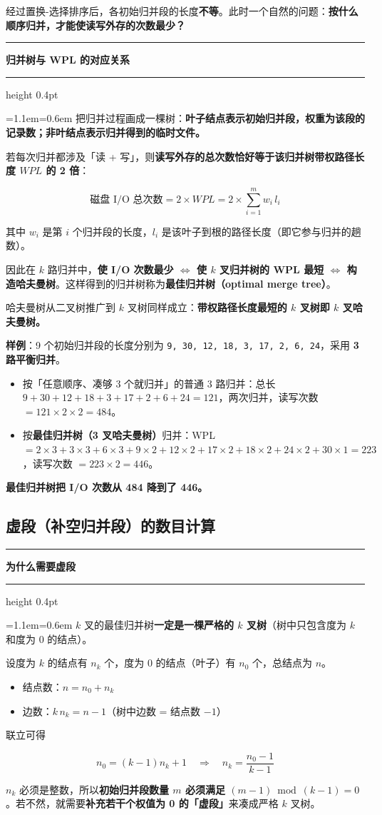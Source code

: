 \documentclass[11pt,openany,UTF8]{ctexbook}
\newcommand{\callouthead}[2]{%
  \par\addvspace{7pt}\noindent
  {\color{#1}\rule[-0.15em]{3pt}{1.05em}}\hspace{0.5em}%
  {\bfseries\color{#1}#2}\par\nobreak\vspace{-0.35em}%
  {\color{rulesep}\hrule height 0.4pt}\nobreak\vspace{0.45em}%
  \begingroup\small\setlength{\parindent}{0pt}%
  \leftskip=1.1em\rightskip=0.6em\noindent\ignorespaces}
\newcommand{\calloutend}{\par\endgroup\addvspace{7pt}}
\newenvironment{callkey}[1]{\callouthead{keybar}{#1}}{\calloutend}
\newenvironment{callwarn}[1]{\callouthead{warnbar}{#1}}{\calloutend}
\begin{document}
经过置换-选择排序后，各初始归并段的长度\textbf{不等}。此时一个自然的问题：\textbf{按什么顺序归并，才能使读写外存的次数最少？}

\begin{callkey}{归并树与 WPL 的对应关系}
把归并过程画成一棵树：\textbf{叶子结点表示初始归并段，权重为该段的记录数；非叶结点表示归并得到的临时文件。}

若每次归并都涉及「读 + 写」，则\textbf{读写外存的总次数恰好等于该归并树带权路径长度 $WPL$ 的 2 倍}：

\[\text{磁盘 I/O 总次数}=2\times WPL=2\times\sum_{i=1}^{m} w_i\, l_i\]

其中 $w_i$ 是第 $i$ 个归并段的长度，$l_i$ 是该叶子到根的路径长度（即它参与归并的趟数）。

因此在 $k$ 路归并中，\textbf{使 I/O 次数最少 $\Leftrightarrow$ 使 $k$ 叉归并树的 WPL 最短 $\Leftrightarrow$ 构造哈夫曼树}。这样得到的归并树称为\textbf{最佳归并树（optimal merge tree）}。

哈夫曼树从二叉树推广到 $k$ 叉树同样成立：\textbf{带权路径长度最短的 $k$ 叉树即 $k$ 叉哈夫曼树。}

\end{callkey}

\textbf{样例}：9 个初始归并段的长度分别为 \texttt{9,\allowbreak{} 30,\allowbreak{} 12,\allowbreak{} 18,\allowbreak{} 3,\allowbreak{} 17,\allowbreak{} 2,\allowbreak{} 6,\allowbreak{} 24}，采用 \textbf{3 路平衡归并}。

\begin{itemize}
\item 按「任意顺序、凑够 3 个就归并」的普通 3 路归并：总长 $9+30+12+18+3+17+2+6+24=121$，两次归并，读写次数 $=121\times2\times2=484$。
\item 按\textbf{最佳归并树（3 叉哈夫曼树）}归并：WPL $=2\times3+3\times3+6\times3+9\times2+12\times2+17\times2+18\times2+24\times2+30\times1=223$，读写次数 $=223\times2=446$。
\end{itemize}
\textbf{最佳归并树把 I/O 次数从 484 降到了 446。}

\subsection{虚段（补空归并段）的数目计算}

\begin{callwarn}{为什么需要虚段}
$k$ 叉的最佳归并树\textbf{一定是一棵严格的 $k$ 叉树}（树中只包含度为 $k$ 和度为 0 的结点）。

设度为 $k$ 的结点有 $n_k$ 个，度为 0 的结点（叶子）有 $n_0$ 个，总结点为 $n$。

\begin{itemize}
\item 结点数：$n=n_0+n_k$
\item 边数：$k\,n_k=n-1$（树中边数 = 结点数 $-1$）
\end{itemize}
联立可得

\[n_0=(k-1)n_k+1 \quad\Longrightarrow\quad n_k=\frac{n_0-1}{k-1}\]

$n_k$ 必须是整数，所以\textbf{初始归并段数量 $m$ 必须满足 $(m-1)\bmod(k-1)=0$}。若不然，就需要\textbf{补充若干个权值为 0 的「虚段」}来凑成严格 $k$ 叉树。

\end{callwarn}
\end{document}
